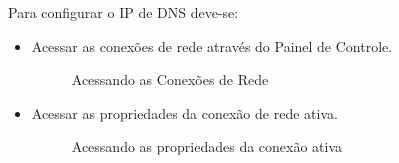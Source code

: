 Para configurar o IP de DNS deve-se:

\begin{itemize}
	
	\item Acessar as conexões de rede através do Painel de Controle.
	\begin{figure}[ht]
			\centering
			\caption{Acessando as Conexões de Rede}
			\label{conexoes_rede}
	\end{figure}
	
	\item Acessar as propriedades da conexão de rede ativa.
	\begin{figure}[ht]
			\centering
			\caption{Acessando as propriedades da conexão ativa}
			\label{propriedades_conexao}
	\end{figure}
	

\end{itemize}
